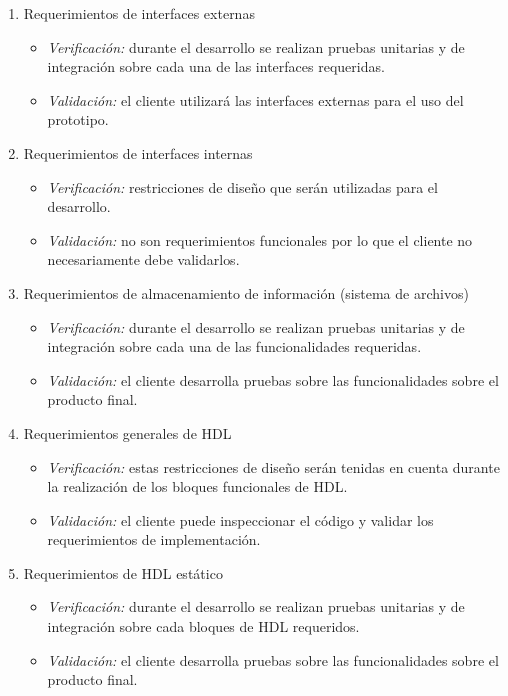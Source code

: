 \documentclass[
11pt, %
]{charter}
\begin{document}
\begin{enumerate}	
	\item Requerimientos de interfaces externas
		\begin{itemize}
			\item \emph{Verificación:} durante el desarrollo se realizan pruebas unitarias y de integración sobre cada una de las interfaces requeridas.
			\item \emph{Validación:} el cliente utilizará las interfaces externas para el uso del prototipo. 
		\end{itemize}
	
	\item Requerimientos de interfaces internas	
		\begin{itemize}
			\item \emph{Verificación:} restricciones de diseño que serán utilizadas para el desarrollo.
			\item \emph{Validación:} no son requerimientos funcionales por lo que el cliente no necesariamente debe validarlos. 
		\end{itemize}
	
	\item Requerimientos de almacenamiento de información (sistema de archivos)
	\begin{itemize}
		\item \emph{Verificación:} durante el desarrollo se realizan pruebas unitarias y de integración sobre cada una de las funcionalidades requeridas.
		\item \emph{Validación:} el cliente desarrolla pruebas sobre las funcionalidades sobre el producto final. 
	\end{itemize}
	
	\item Requerimientos generales de HDL
	\begin{itemize}
		\item \emph{Verificación:} estas restricciones de diseño serán tenidas en cuenta durante la realización de los bloques funcionales de HDL.
		\item \emph{Validación:} el cliente puede inspeccionar el código y validar los requerimientos de implementación. 
	\end{itemize}
	
	\item Requerimientos de HDL estático
	\begin{itemize}		
		\item \emph{Verificación:} durante el desarrollo se realizan pruebas unitarias y  de integración sobre cada bloques de HDL requeridos.
		\item \emph{Validación:} el cliente desarrolla pruebas sobre las funcionalidades sobre el producto final. 
	\end{itemize}
	

\end{enumerate}
\end{document}
